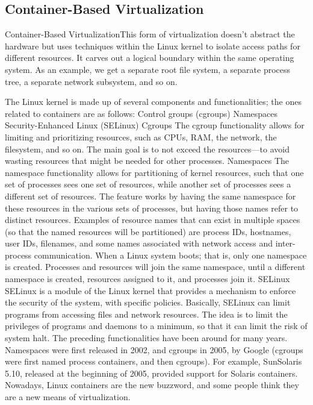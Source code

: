 \subsection{Container-Based  Virtualization}
Container-Based  VirtualizationThis form of virtualization doesn’t abstract the 
hardware but uses techniques within the Linux kernel to isolate access paths for
 different resources. It carves out a logical boundary within the same operating 
 system. As an example, we get a separate root file system, a separate process tree, 
 a separate network subsystem, and so on.


The Linux kernel is made up of several components and functionalities; the ones related to
containers are as follows:
Control groups (cgroups)
Namespaces
Security-Enhanced Linux (SELinux)
Cgroups
The cgroup functionality allows for limiting and prioritizing resources, such as CPUs,
RAM, the network, the filesystem, and so on. The main goal is to not exceed the
resources—to avoid wasting resources that might be needed for other processes.
Namespaces
The namespace functionality allows for partitioning of kernel resources, such that one set of
processes sees one set of resources, while another set of processes sees a different set of
resources. The feature works by having the same namespace for these resources in the
various sets of processes, but having those names refer to distinct resources. Examples of
resource names that can exist in multiple spaces (so that the named resources will be
partitioned) are process IDs, hostnames, user IDs, filenames, and some names associated
with network access and inter-process communication.
When a Linux system boots; that is, only one namespace is created. Processes and resources
will join the same namespace, until a different namespace is created, resources assigned to
it, and processes join it.
SELinux
SELinux is a module of the Linux kernel that provides a mechanism to enforce the security
of the system, with specific policies.
Basically, SELinux can limit programs from accessing files and network resources. The idea
is to limit the privileges of programs and daemons to a minimum, so that it can limit the
risk of system halt.
The preceding functionalities have been around for many years. Namespaces were first
released in 2002, and cgroups in 2005, by Google (cgroups were first named process
containers, and then cgroups). For example, SunSolaris 5.10, released at the beginning of
2005, provided support for Solaris containers.
Nowadays, Linux containers are the new buzzword, and some people think they are a
new means of virtualization.
